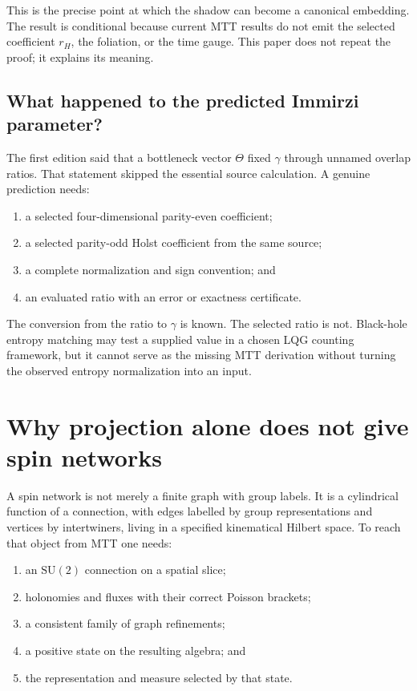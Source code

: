 \documentclass[11pt]{article}
\begin{document}
This is the precise point at which the shadow can become a canonical
embedding. The result is conditional because current MTT results do not emit
the selected coefficient \(r_H\), the foliation, or the time gauge. This
paper does not repeat the proof; it explains its meaning.

\subsection{What happened to the predicted Immirzi parameter?}

The first edition said that a bottleneck vector \(\Theta\) fixed
\(\gamma\) through unnamed overlap ratios. That statement skipped the
essential source calculation. A genuine prediction needs:
\begin{enumerate}
\item a selected four-dimensional parity-even coefficient;
\item a selected parity-odd Holst coefficient from the same source;
\item a complete normalization and sign convention; and
\item an evaluated ratio with an error or exactness certificate.
\end{enumerate}
The conversion from the ratio to \(\gamma\) is known. The selected ratio is
not. Black-hole entropy matching may test a supplied value in a chosen LQG
counting framework, but it cannot serve as the missing MTT derivation without
turning the observed entropy normalization into an input.

\section{Why projection alone does not give spin networks}

A spin network is not merely a finite graph with group labels. It is a
cylindrical function of a connection, with edges labelled by group
representations and vertices by intertwiners, living in a specified
kinematical Hilbert space. To reach that object from MTT one needs:
\begin{enumerate}
\item an \(\mathrm{SU}(2)\) connection on a spatial slice;
\item holonomies and fluxes with their correct Poisson brackets;
\item a consistent family of graph refinements;
\item a positive state on the resulting algebra; and
\item the representation and measure selected by that state.
\end{enumerate}
\end{document}
